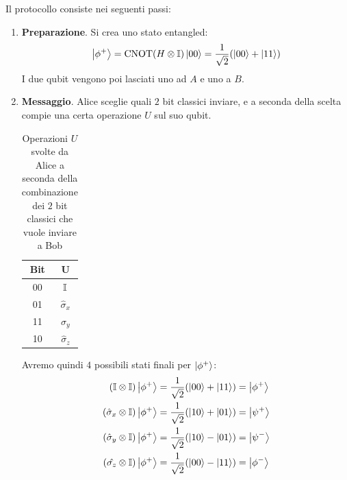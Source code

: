 \documentclass[../../InformazioneQuantistica.tex]{subfiles}
\begin{document}
Il protocollo consiste nei seguenti passi:
\begin{enumerate}
\item \textbf{Preparazione}. Si crea uno stato entangled:
\begin{align*}
\Ket{\phi^+} = \operatorname{CNOT}(H\otimes \mathbb{I})\Ket{00} = \frac{1}{\sqrt{2}}(\Ket{00}+\Ket{11})
\end{align*}
I due qubit vengono poi lasciati uno ad $A$ e uno a $B$.
\item \textbf{Messaggio}. Alice sceglie quali $2$ bit classici inviare, e a seconda della scelta compie una certa operazione $U$ sul suo qubit.

\begin{table}[H]
\centering
\begin{tabular}{cc}
\toprule
\textbf{Bit} & $\bm{U}$ \\ \midrule
00 & $\mathbb{I}$\\
01 & $\hat{\sigma}_x$\\
11 & $\hat{\sigma}_y$\\
10 & $\hat{\sigma}_z$ \\ \bottomrule
\end{tabular}
\caption{Operazioni $U$ svolte da Alice a seconda della combinazione dei $2$ bit classici che vuole inviare a Bob}
\end{table}

Avremo quindi $4$ possibili stati finali per $\Ket{\phi^+}$:
\begin{align*}
(\mathbb{I}\otimes \mathbb{I}) \Ket{\phi^+} &= \frac{1}{\sqrt{2}}(\Ket{00}+\Ket{11}) = \Ket{\phi^+}\\
(\hat{\sigma}_x \otimes \mathbb{I}) \Ket{\phi^+} &= \frac{1}{\sqrt{2}} (\Ket{10}+\Ket{01}) = \Ket{\psi^+}\\
(\hat{\sigma}_y \otimes \mathbb{I}) \Ket{\phi^+} &= \frac{1}{\sqrt{2}}(\Ket{10}-\Ket{01}) =\Ket{\psi^-}\\
(\hat{\sigma_z} \otimes \mathbb{I}) \Ket{\phi^+} &= \frac{1}{\sqrt{2}}(\Ket{00}-\Ket{11}) = \Ket{\phi^-}\\
\end{align*}


\end{enumerate}
\end{document}
